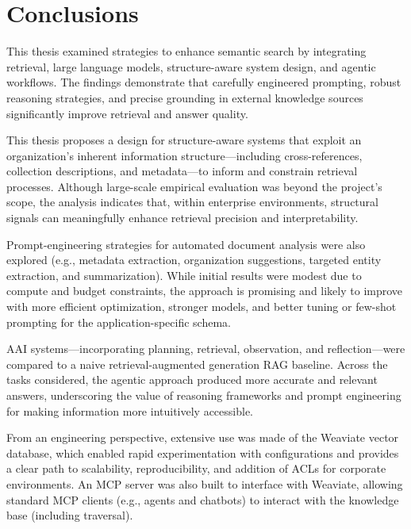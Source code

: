 \cleardoublepage%
\label{chap:conclusion}%


\section{Conclusions}

This thesis examined strategies to enhance semantic search by integrating retrieval, large language models, structure-aware system design, and agentic workflows. The findings demonstrate that carefully engineered prompting, robust reasoning strategies, and precise grounding in external knowledge sources significantly improve retrieval and answer quality.

This thesis proposes a design for structure-aware systems that exploit an organization's inherent information structure—including cross-references, collection descriptions, and metadata—to inform and constrain retrieval processes. Although large-scale empirical evaluation was beyond the project's scope, the analysis indicates that, within enterprise environments, structural signals can meaningfully enhance retrieval precision and interpretability.

Prompt-engineering strategies for automated document analysis were also explored (e.g., metadata extraction, organization suggestions, targeted entity extraction, and summarization). While initial results were modest due to compute and budget constraints, the approach is promising and likely to improve with more efficient optimization, stronger models, and better tuning or few-shot prompting for the application-specific schema.

\gls{AAI} systems—incorporating planning, retrieval, observation, and reflection—were compared to a naive retrieval-augmented generation \gls{RAG} baseline. Across the tasks considered, the agentic approach produced more accurate and relevant answers, underscoring the value of reasoning frameworks and prompt engineering for making information more intuitively accessible.

From an engineering perspective, extensive use was made of the Weaviate vector database, which enabled rapid experimentation with configurations and provides a clear path to scalability, reproducibility, and addition of \glspl{ACL} for corporate environments. An \gls{MCP} server was also built to interface with Weaviate, allowing standard \gls{MCP} clients (e.g., agents and chatbots) to interact with the knowledge base (including traversal).

